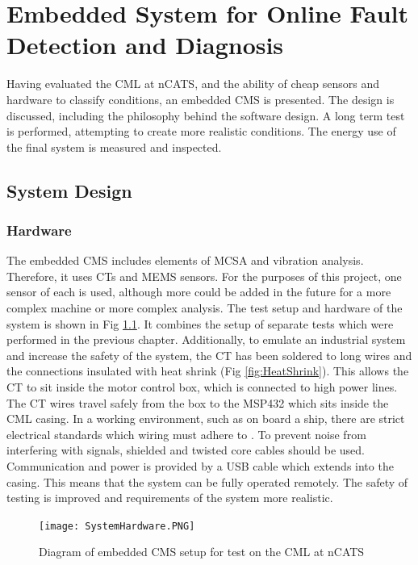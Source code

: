 \chapter{Embedded System for Online Fault Detection and Diagnosis}

Having evaluated the CML at nCATS, and the ability of cheap sensors and hardware to classify conditions, an embedded CMS is presented.
The design is discussed, including the philosophy behind the software design.
A long term test is performed, attempting to create more realistic conditions.
The energy use of the final system is measured and inspected.

\section{System Design}

\subsection{Hardware}

The embedded CMS includes elements of MCSA and vibration analysis.
Therefore, it uses CTs and MEMS sensors.
For the purposes of this project, one sensor of each is used, although more could be added in the future for a more complex machine or more complex analysis.
The test setup and hardware of the system is shown in Fig \ref{fig:SystemHardware}.
It combines the setup of separate tests which were performed in the previous chapter.
Additionally, to emulate an industrial system and increase the safety of the system, the CT has been soldered to long wires and the connections insulated with heat shrink (Fig \ref{fig:HeatShrink}).
This allows the CT to sit inside the motor control box, which is connected to high power lines.
The CT wires travel safely from the box to the MSP432 which sits inside the CML casing.
In a working environment, such as on board a ship, there are strict electrical standards which wiring must adhere to \cite{BS7917-1999}.
To prevent noise from interfering with signals, shielded and twisted core cables should be used.
Communication and power is provided by a USB cable which extends into the casing.
This means that the system can be fully operated remotely.
The safety of testing is improved and requirements of the system more realistic.
\par

\begin{figure}
    \centering
    \texttt{[image: SystemHardware.PNG]}
    \caption{Diagram of embedded CMS setup for test on the CML at nCATS}
    \label{fig:SystemHardware}
\end{figure}

